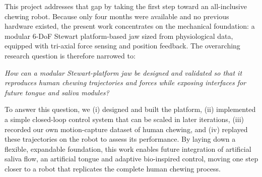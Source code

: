 This project addresses that gap by taking the first step toward an all-inclusive chewing robot. Because only four months were available and no previous hardware 
existed, the present work concentrates on the mechanical foundation: a modular 6-DoF Stewart platform-based jaw sized from physiological data, equipped with tri-axial 
force sensing and position feedback. The overarching research question is therefore narrowed to:

\textit{How can a modular Stewart-platform jaw be designed and validated so that it reproduces human chewing trajectories and forces while exposing interfaces for 
future tongue and saliva modules?}

To answer this question, we (i) designed and built the platform, (ii) implemented a simple closed-loop control system that can be scaled in later iterations, 
(iii) recorded our own motion-capture dataset of human chewing, and (iv) replayed these trajectories on the robot to assess its performance. By laying down a 
flexible, expandable foundation, this work enables future integration of artificial saliva flow, an artificial tongue and adaptive bio-inspired control, 
moving one step closer to a robot that replicates the complete human chewing process.